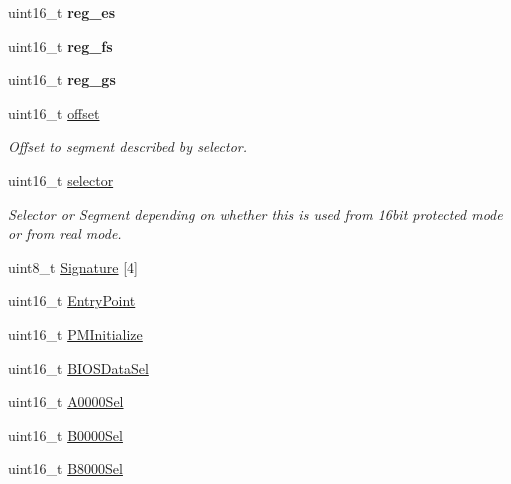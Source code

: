 \begin{DoxyCompactItemize}
uint16\+\_\+t {\bfseries reg\+\_\+es}
\item 
\mbox{\label{structRTEMS__PACKED_aeab5083b6d6448666fdd111a11490ef0}} 
uint16\+\_\+t {\bfseries reg\+\_\+fs}
\item 
\mbox{\label{structRTEMS__PACKED_a21b4092f899406304597d972fe179b20}} 
uint16\+\_\+t {\bfseries reg\+\_\+gs}
\item 
\mbox{\label{structRTEMS__PACKED_a798fc70aa234e32ee2148a0b31694fd5}} 
uint16\+\_\+t \mbox{\hyperlink{structRTEMS__PACKED_a798fc70aa234e32ee2148a0b31694fd5}{offset}}
\begin{DoxyCompactList}\small\item\em Offset to segment described by {\itshape selector}. \end{DoxyCompactList}\item 
\mbox{\label{structRTEMS__PACKED_ad2e7289cc075151b64634ade19709a07}} 
uint16\+\_\+t \mbox{\hyperlink{structRTEMS__PACKED_ad2e7289cc075151b64634ade19709a07}{selector}}
\begin{DoxyCompactList}\small\item\em Selector or Segment depending on whether this is used from 16bit protected mode or from real mode. \end{DoxyCompactList}\item 
uint8\+\_\+t \mbox{\hyperlink{structRTEMS__PACKED_a0181181a3e3545e343e01b2c988a824b}{Signature}} \mbox{[}4\mbox{]}
\item 
uint16\+\_\+t \mbox{\hyperlink{structRTEMS__PACKED_affa0d7fcc00af6c06a99c6e377bfbcfc}{Entry\+Point}}
\item 
uint16\+\_\+t \mbox{\hyperlink{structRTEMS__PACKED_a6355cfdc25353c0836a55e7c788eb515}{P\+M\+Initialize}}
\item 
uint16\+\_\+t \mbox{\hyperlink{structRTEMS__PACKED_a47614661753c3125a33b0592b7aa489c}{B\+I\+O\+S\+Data\+Sel}}
\item 
uint16\+\_\+t \mbox{\hyperlink{structRTEMS__PACKED_a79f9bcdc9ed720468301ab6ff09b2763}{A0000\+Sel}}
\item 
uint16\+\_\+t \mbox{\hyperlink{structRTEMS__PACKED_af1b07483ed8d8d0e7b16e03e24ccbc3d}{B0000\+Sel}}
\item 
uint16\+\_\+t \mbox{\hyperlink{structRTEMS__PACKED_aa2656c2d01a4789f901122dcb8a548c0}{B8000\+Sel}}

\end{DoxyCompactItemize}
